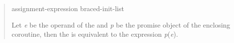 \begin{quote}
\begin{bnf}
  \br
   assignment-expression\br
   braced-init-list
\end{bnf}

\pnum
  Let \textit{e} be the operand of the  and \textit{p} be the promise object of the enclosing coroutine, then the  is equivalent to the expression  \textit{p}(\textit{e}).

%  
%
%
%


\end{quote}


